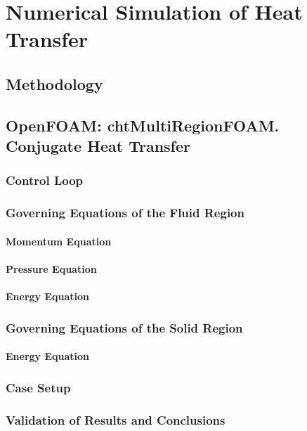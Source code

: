\chapter{Numerical Simulation of Heat Transfer} %

\label{Chapter4}

\section{Methodology}
\section{OpenFOAM: chtMultiRegionFOAM. Conjugate Heat Transfer}
\subsection{Control Loop}
\subsection{Governing Equations of the Fluid Region}
\subsubsection{Momentum Equation}
\subsubsection{Pressure Equation}
\subsubsection{Energy Equation}
\subsection{Governing Equations of the Solid Region}
\subsubsection{Energy Equation}
\subsection{Case Setup}
\subsection{Validation of Results and Conclusions}

